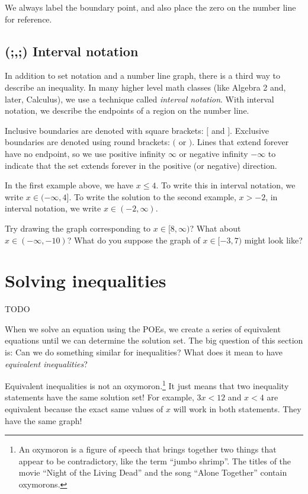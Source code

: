 We always label the boundary point, and also place the zero on the number line for reference.

\subsection{(;,;) Interval notation}

In addition to set notation and a number line graph, there is a third way to describe an inequality. In many higher level math classes (like Algebra 2 and, later, Calculus), we use a technique called \textit{interval notation}. With interval notation, we describe the endpoints of a region on the number line.

Inclusive boundaries are denoted with square brackets: $[$ and $]$.  Exclusive boundaries are denoted using round brackets: $($ or $)$. Lines that extend forever have no endpoint, so we use positive infinity $\infty$ or negative infinity $-\infty$ to indicate that the set extends forever in the positive (or negative) direction.

In the first example above, we have $x \leq 4$. To write this in interval notation, we write $x \in (-\infty, 4]$. To write the solution to the second example, $x>-2$, in interval notation, we write $x \in (-2, \infty)$.

Try drawing the graph corresponding to $x \in [8, \infty)$? What about $x \in (-\infty, -10)$? What do you suppose the graph of $x \in [-3, 7)$ might look like?

\section{Solving inequalities}
\label{sec:ineqsolving}

\begin{boxedexplore}
TODO
\end{boxedexplore}


When we solve an equation using the POEs, we create a series of equivalent equations until we can determine the solution set. The big question of this section is: Can we do something similar for inequalities? What does it mean to have \textit{equivalent inequalities}?

Equivalent inequalities is not an oxymoron.\footnote{An oxymoron is a figure of speech that brings together two things that appear to be contradictory, like the term ``jumbo shrimp''. The titles of the movie ``Night of the Living Dead'' and the song ``Alone Together'' contain oxymorons.} It just means that two inequality statements have the same solution set! For example, $3x < 12$ and $x < 4$ are equivalent because the exact same values of $x$ will work in both statements. They have the same graph!


